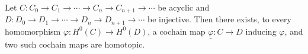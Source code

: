 Let $C : C_0 \to C_1 \to \cdots \to C_n \to C_{n+1} \to \cdots$ be acyclic and $D : D_0 \to D_1 \to \cdots \to D_n \to D_{n+1} \to \cdots$ be injective. Then there exists, to every homomorphism $\varphi : H^0(C) \to H^0(D)$, a cochain map $\underline{\varphi} : C \to D$ inducing $\varphi$, and two such cochain maps are homotopic.